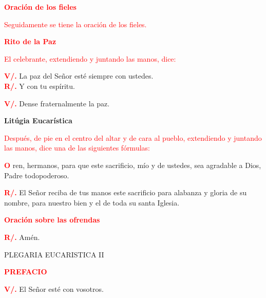 \documentclass[12pt, letterpaper]{article}
\begin{document}
  \Large {\bfseries \textcolor{red}{Oraci\'on de los fieles}} 

  \large {\textcolor{red}{Seguidamente se tiene la oraci\'on de los fieles.}} 

  \Large {\bfseries \textcolor{red}{Rito de la Paz}}

  \large {\textcolor{red}{El celebrante, extendiendo y juntando las manos, dice:}}

  \noindent
  \Large {\bfseries \textcolor{red}{V/.}} \hspace{0.5cm} La paz del Se\~nor est\'e siempre con ustedes.\\
  \noindent
  \Large {\bfseries \textcolor{red}{R/.}} \hspace{0.5cm} Y con tu esp\'iritu. 

  \noindent
  \Large {\bfseries \textcolor{red}{V/.}} \hspace{0.5cm} Dense fraternalmente la paz. 

  \begin{center}
    \Huge {\bfseries Lit\'ugia Eucar\'istica}
  \end{center}

  \large {\textcolor{red}{Despu\'es, de pie en el centro del altar y de cara al pueblo, extendiendo y juntando las manos, dice una de las siguientes f\'ormulas:}}

  \lettrine[lines=2]{\bfseries \textcolor{red}{O}}{} \Large ren, hermanos, para que este sacrificio, m\'io y de ustedes, sea agradable a Dios, Padre todopoderoso. 

  \noindent
  \Large {\bfseries \textcolor{red}{R/.}} \hspace{0.5cm} El Se\~nor reciba de tus manos este sacrificio para alabanza y gloria de su nombre, para nuestro bien y el de toda su santa Iglesia.

  \Large {\bfseries \textcolor{red}{Oraci\'on sobre las ofrendas}}

  \noindent
  \Large {\bfseries \textcolor{red}{R/.}} \hspace{0.5cm} Am\'en.

  \begin{center}
    \Large PLEGARIA EUCARISTICA II
  \end{center}

  \Large {\bfseries \textcolor{red}{PREFACIO}}

  \noindent
  \Large {\bfseries \textcolor{red}{V/.}} \hspace{0.5cm} El Se\~nor est\'e con vosotros.
\end{document}
